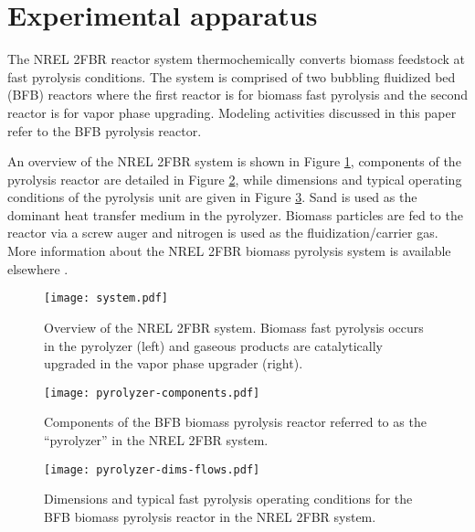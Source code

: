 
\section{Experimental apparatus}

The NREL 2FBR reactor system thermochemically converts biomass feedstock at fast pyrolysis conditions. The system is comprised of two bubbling fluidized bed (BFB) reactors where the first reactor is for biomass fast pyrolysis and the second reactor is for vapor phase upgrading. Modeling activities discussed in this paper refer to the BFB pyrolysis reactor.

An overview of the NREL 2FBR system is shown in Figure \ref{fig:nrel-system}, components of the pyrolysis reactor are detailed in Figure \ref{fig:pyrolyzer-components}, while dimensions and typical operating conditions of the pyrolysis unit are given in Figure \ref{fig:pyrolyzer-dims-flows}. Sand is used as the dominant heat transfer medium in the pyrolyzer. Biomass particles are fed to the reactor via a screw auger and nitrogen is used as the fluidization/carrier gas. More information about the NREL 2FBR biomass pyrolysis system is available elsewhere \cite{Howe-2015, Trendewicz-2015}.

\begin{figure}[H]
    \centering
    \texttt{[image: system.pdf]}
    \caption{Overview of the NREL 2FBR system. Biomass fast pyrolysis occurs in the pyrolyzer (left) and gaseous products are catalytically upgraded in the vapor phase upgrader (right).}
    \label{fig:nrel-system}
\end{figure}

\begin{figure}[H]
    \centering
    \texttt{[image: pyrolyzer-components.pdf]}
    \caption{Components of the BFB biomass pyrolysis reactor referred to as the ``pyrolyzer'' in the NREL 2FBR system.}
    \label{fig:pyrolyzer-components}
\end{figure}

\begin{figure}[H]
    \centering
    \texttt{[image: pyrolyzer-dims-flows.pdf]}
    \caption{Dimensions and typical fast pyrolysis operating conditions for the BFB biomass pyrolysis reactor in the NREL 2FBR system.}
    \label{fig:pyrolyzer-dims-flows}
\end{figure}
